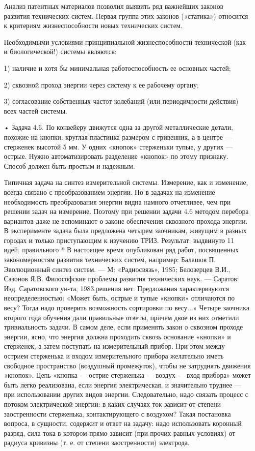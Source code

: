 Анализ  патентных материалов  позволил выявить  ряд важнейших  законов
развития технических  систем. Первая  группа этих  законов («статика»)
относится к критериям жизнеспособности новых технических систем.

Необходимыми  условиями  принципиальной  жизнеспособности  технической
(как и биологической!) системы являются:

1) наличие и хотя бы минимальная работоспособность ее основных частей;

2) сквозной проход энергии через систему к ее рабочему органу;

3)  согласование  собственных   частот  колебаний  (или  периодичности
действия) всех частей системы.

•  Задача 4.6.  По  конвейеру движутся  одна  за другой  металлические
детали, похожие на кнопки: круглая пластинка размером с гривенник, а в
центре — стерженек высотой 5 мм.  У одних «кнопок» стерженьки тупые, у
других —  острые. Нужно автоматизировать разделение  «кнопок» по этому
признаку. Способ должен быть простым и надежным.

Типичная  задача на  синтез  измерительной системы.  Измерение, как  и
изменение,  всегда связано  с  преобразованием энергии.  Но в  задачах
на  изменение  необходимость   преобразования  энергии  видна  намного
отчетливее, чем  при решении задач  на измерение. Поэтому  при решении
задачи  4.6 методом  перебора вариантов  даже не  вспоминают о  законе
обеспечения  сквозного прохода  энергии.  В  эксперименте задача  была
предложена  четырем  заочникам,  живущим  в разных  городах  и  только
приступающим   к  изучению   ТРИЗ.  Результат:   выдвинуто  11   идей,
правильного  * В  настоящее время  опубликован ряд  работ, посвященных
закономерностям  развития  технических  систем, например:  Балашов  П.
Эволюционный  синтез  систем.  —  М:  «Радиосвязь»,  1985;  Белозерцев
В.И.,  Сазонов Я.В.  Философские проблемы  развития технических  наук.
—  Саратов: Изд.  Саратовского  ун-та,  1983.решения нет.  Предложения
характеризуются  неопределенностью:   «Может  быть,  острые   и  тупые
«кнопки»  отличаются   по  весу?  Тогда  надо   проверить  возможность
сортировки  по весу...»  Четыре  заочника второго  года обучения  дали
правильные ответы,  причем двое из них  отметили тривиальность задачи.
В  самом  деле,  если  применять закон  о  сквозном  проходе  энергии,
ясно,  что  энергия  должна  проходить  сквозь  основание  «кнопки»  и
стерженек, а затем  поступать на измерительный прибор.  При этом между
острием стерженька  и входом  измерительного прибора  желательно иметь
свободное  пространство (воздушный  промежуток),  чтобы не  затруднять
движения «кнопок».  Цепь «кнопка —  острие стерженька — воздух  — вход
прибора»  может быть  легко реализована,  если энергия  электрическая,
и  значительно  труднее  —  при использовании  других  видов  энергии.
Следовательно, надо  связать процесс с потоком  электрической энергии:
в  каких  случаях ток  зависит  от  степени заостренности  стерженька,
контактирующего  с воздухом?  Такая  постановка  вопроса, в  сущности,
содержит и  ответ на задачу:  надо использовать коронный  разряд, сила
тока в котором  прямо зависит (при прочих равных  условиях) от радиуса
кривизны (т. е. от степени заостренности) электрода.


